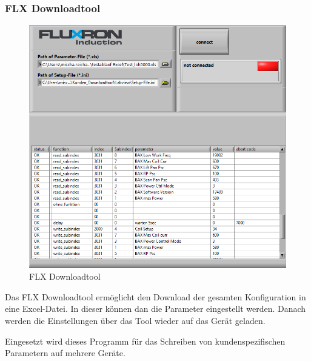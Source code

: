 \subsubsection{FLX Downloadtool}
\label{subsubsec:FLX Downloadtool}
\begin{figure}
  \begin{center}
  	\vspace{-26pt}
	\includegraphics[scale=0.35]{analysis/res/flxdltool}
	\caption{FLX Downloadtool}
	\vspace{-100pt}
  \end{center}
\end{figure}

Das FLX Downloadtool ermöglicht den Download der gesamten Konfiguration in eine Excel-Datei. In dieser können dan die Parameter eingestellt werden. Danach werden die Einstellungen über das Tool wieder auf das Gerät geladen.

Eingesetzt wird dieses Programm für das Schreiben von kundenspezifischen Parametern auf mehrere Geräte.
\vspace{160pt}
